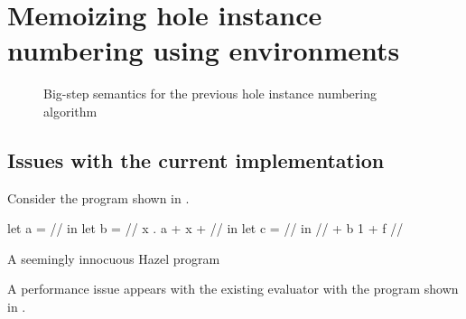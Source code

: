 \section{Memoizing hole instance numbering using environments}
\label{sec:renumbering}

\begin{singlespace}
  \begin{figure}
    \centering
    \begin{subfigure}{\textwidth}
      \begin{mdframed}[bottomline=false]
        
      \end{mdframed}
    \end{subfigure}
  \end{figure}
  \begin{figure}
    \ContinuedFloat
    \begin{subfigure}{\textwidth}
      \begin{mdframed}[topline=false]
        
      \end{mdframed}
    \end{subfigure}
    \caption{Big-step semantics for the previous hole instance numbering algorithm}
    \label{fig:big-step-renumber-old-rules}
  \end{figure}
\end{singlespace}

\subsection{Issues with the current implementation}
\label{sec:current_problems}

Consider the program shown in .

\begin{listing}
  \centering
  \begin{hminted}
let a = // in
let b = /\lbd/ x . { a + x + // } in
let c = // in
// + b 1 + f //
  \end{hminted}
  \caption{A seemingly innocuous Hazel program}
  \label{fig:sample_hazel_program}
\end{listing}

A performance issue appears with the existing evaluator with the program shown in .




